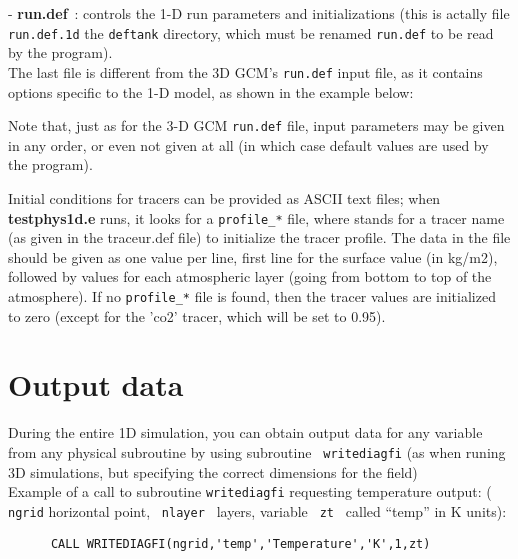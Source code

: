 - {\bf run.def}~: controls the 1-D run parameters and initializations
(this is actally file {\tt run.def.1d} the {\tt deftank} directory,
which must be renamed {\tt run.def} to be read by the program).\\

The last file is different from the 3D GCM's {\tt run.def} input file,
as it contains options specific to the 1-D model, as shown in the example
below:
{\footnotesize

}
Note that, just as for the 3-D GCM {\tt run.def} file, input
parameters may be given in any order, or even not given at all
(in which case default values are used by the program).

Initial conditions for tracers can be provided as ASCII text files; when
{\bf testphys1d.e} runs, it looks for a {\tt profile\_*} file, where {\tt *}
stands for a tracer name (as given in the traceur.def file) to initialize
the tracer profile. The data in the file should be given as one value per
line, first line for the surface value (in kg/m2), followed by values for each
atmospheric layer (going from bottom to top of the atmosphere).
If no {\tt profile\_*} file is found, then the tracer values are initialized
to zero (except for the 'co2' tracer, which will be set to 0.95).

\section{Output data}

During the entire 1D simulation, you can obtain output data for any
variable from any physical subroutine by using subroutine \verb+ writediagfi+
(as when runing 3D simulations, but specifying the correct dimensions for the field) \\

Example of a call to subroutine {\tt writediagfi} requesting
temperature output:
(\verb+ ngrid+ horizontal point, \verb+ nlayer + layers, variable
\verb+ zt + called ``temp'' in K units):

\begin{verbatim}
      CALL WRITEDIAGFI(ngrid,'temp','Temperature','K',1,zt)
\end{verbatim}



